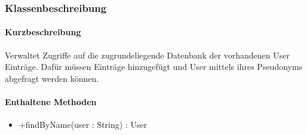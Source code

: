 \subsubsection*{Klassenbeschreibung}%
\paragraph*{Kurzbeschreibung}
Verwaltet Zugriffe auf die zugrundeliegende Datenbank der vorhandenen User Einträge.
Dafür müssen Einträge hinzugefügt und User mittels ihres Pseudonyms abgefragt werden können.
\paragraph*{Enthaltene Methoden}
\begin{itemize}
    \item +findByName(user : String) : User
\end{itemize}
